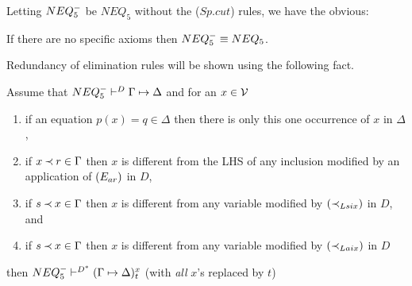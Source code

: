 Letting $NEQ_5^-$ be $NEQ_5$
without the ($Sp.cut$) rules, we have the obvious:
\begin{LEMMA}
If there are no specific axioms then $NEQ_5^-\equiv NEQ_5$.
\end{LEMMA}
%
Redundancy of elimination rules will be shown using the following fact.
\begin{LEMMA}\label{le:ssp}
Assume that ${NEQ_5^-}\vdash^{{D}}\Gamma\mathrel{\mapsto}\Delta$ and for an $x\in{\cal V}$
\begin{enumerate}\MyLPar
\item\label{ca:ax} if an equation $p(x)=q \in \Delta$ then there is only this one
occurrence of $x$ in $\Delta$,
\item\label{ca:el2} if $x\mathbin{\prec} r \in\Gamma$ then $x$ is different from the LHS of any
inclusion modified by an application of $(E_{ar})$ in $D$,
\item\label{ca:six} if $s\mathbin{\prec} x \in\Gamma$ then $x$ is different from any variable
modified by $(\mathbin{\prec}_{Lsix})$ in $D$, and
\item\label{ca:aix} if $s\mathbin{\prec} x \in\Gamma$ then $x$ is different from any variable
modified by $(\mathbin{\prec}_{Laix})$ in $D$
\end{enumerate}
\noindent
then ${NEQ_5^-}\vdash^{{D^*}}(\Gamma\mathrel{\mapsto}\Delta)_t^x$ (with {\em all} $x$'s replaced by $t$)
\end{LEMMA}
